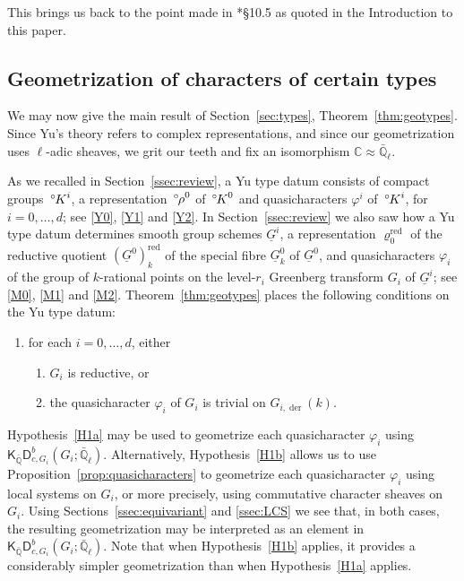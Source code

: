 \documentclass[10pt]{amsart}
\makeatletter
\theoremstyle{plain}
\theoremstyle{definition}
\newcommand{\CC}{{\mathbb{C}}}
\newcommand{\QQ}{{\mathbb{Q}}}
\newcommand{\EE}{\mathbb{\bar Q}_\ell}
\newcommand{\labitem}[2]{
\def\@itemlabel{\textbf{#1}}
\item
\def\@currentlabel{#1}\label{#2}}
\newcommand{\red}{^{\operatorname{red}}}
\newcommand{\oK}{{\,^\circ \hskip-1pt K}}
\newcommand{\orho}{{\,^\circ \hskip-1pt \rho}}
\makeatother
\begin{document}
This brings us back to the point made in \cite{Yu:models}*{\S 10.5} as quoted in the Introduction to this paper.

\subsection{Geometrization of characters of certain types}\label{ssec:geotypes}

We may now give the main result of Section~\ref{sec:types}, Theorem~\ref{thm:geotypes}.
Since Yu's theory refers to complex representations, and since our geometrization uses $\ell$-adic sheaves, we grit our teeth and fix an isomorphism $\CC \approx \EE$.


As we recalled in Section~\ref{ssec:review}, a Yu type datum consists of compact groups $\oK^i$, a representation $\orho^0$ of $\oK^0$ and quasicharacters $\varphi^i$ of $\oK^i$, for $i=0,\ldots, d$; see \ref{Y0}, \ref{Y1} and \ref{Y2}.
In Section~\ref{ssec:review} we also saw how a Yu type datum determines smooth group schemes $\underline{G}^i$, a representation $\varrho_0\red$ of the reductive quotient $(\underline{G}^0)\red_{k}$ of the special fibre $\underline{G}^0_{k}$ of $\underline{G}^0$, and quasicharacters $\varphi_i$ of the group of $k$-rational points on the level-$r_i$ Greenberg transform $G_i$ of $\underline{G}^i$; see \ref{M0}, \ref{M1} and \ref{M2}.
%
Theorem~\ref{thm:geotypes} places the following conditions on the Yu type datum:
\begin{enumerate}
\labitem{H1}{H1} for each $i=0,\ldots, d$, either
\begin{enumerate}
\labitem{H1(a)}{H1a} $G_i$ is reductive, or %
\labitem{H1(b)}{H1b} the quasicharacter $\varphi_i$ of $G_i$ is trivial on  $G_{i,\operatorname{der}}(k)$. 
\end{enumerate}
\end{enumerate}
Hypothesis~\ref{H1a} may be used to geometrize each quasicharacter $\varphi_i$ using $\mathsf{K}_{\bar\QQ}\mathsf{D}^b_{c,G_i}(G_i;\EE)$.
Alternatively, Hypothesis~\ref{H1b} allows us to use Proposition~\ref{prop:quasicharacters} to geometrize each quasicharacter $\varphi_i$ using local systems on $G_i$, or more precisely, using commutative character sheaves on $G_i$.
Using Sections~\ref{ssec:equivariant} and \ref{ssec:LCS} we see that, in both cases, the resulting geometrization may be interpreted as an element in $\mathsf{K}_{\bar\QQ}\mathsf{D}^b_{c,G_i}(G_i;\EE)$.
Note that when Hypothesis~\ref{H1b} applies, it provides a considerably simpler geometrization than when Hypothesis~\ref{H1a} applies.
\end{document}
